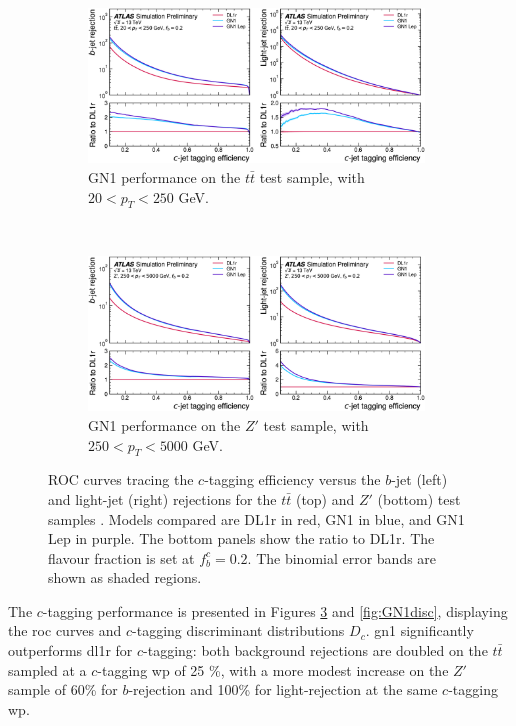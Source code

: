 \begin{figure}[h!]
  \centering
  \begin{subfigure}[b]{0.98\textwidth}
      \centering
      \includegraphics[width=0.98\textwidth]{Images/FTAG/GN/GN1/ROC/ttc.png}
      \caption{GN1 performance on the $t\bar{t}$ test sample, with $20 < p_T < 250$ GeV.} 
      \label{fig:GN1ttc}
  \end{subfigure}\\
  \begin{subfigure}[b]{0.98\textwidth}
    \centering
      \includegraphics[width=0.98\textwidth]{Images/FTAG/GN/GN1/ROC/zpc.png}
      \caption{GN1 performance on the $Z'$ test sample, with $250 < p_T < 5000$ GeV.} 
      \label{fig:GN1zpc}
  \end{subfigure}
  \caption{ROC curves tracing the $c$-tagging efficiency versus the $b$-jet (left) and light-jet (right) rejections for the $t\bar{t}$ (top) and $Z'$ (bottom) test samples \cite{ATL-PHYS-PUB-2022-027}. Models compared are DL1r in red, GN1 in blue, and GN1 Lep in purple. The bottom panels show the ratio to DL1r. The flavour fraction is set at $f^c_b = 0.2$. The binomial error bands are shown as shaded regions.}
  \label{fig:GN1rocc}
\end{figure} 

The $c$-tagging performance is presented in Figures \ref{fig:GN1rocc} and \ref{fig:GN1disc}, displaying the \gls{roc} curves and $c$-tagging discriminant distributions $D_c$. \gls{gn1} significantly outperforms \gls{dl1r} for $c$-tagging: both background rejections are doubled on the $t\bar{t}$ sampled at a $c$-tagging \gls{wp} of 25 \%, with a more modest increase on the $Z'$ sample of 60\% for $b$-rejection and 100\% for light-rejection at the same $c$-tagging \gls{wp}. 

